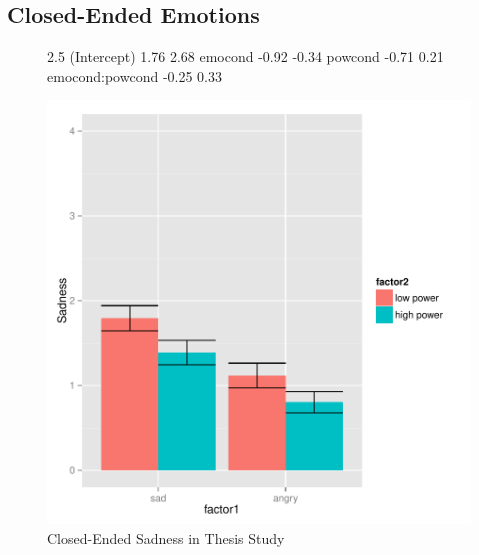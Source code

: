 \documentclass[man,apacite,floatsintext]{apa6}
\begin{document}
\subsection{Closed-Ended Emotions}
\newpage
\begin{figure}
\begin{Schunk}
\begin{Soutput}
                2.5 %
(Intercept)      1.76   2.68
emocond         -0.92  -0.34
powcond         -0.71   0.21
emocond:powcond -0.25   0.33
\end{Soutput}
\end{Schunk}
\includegraphics{PowerResults-ThesisCloseSad}
\caption{Closed-Ended Sadness in Thesis Study}
\end{figure}
\newpage
\end{document}
